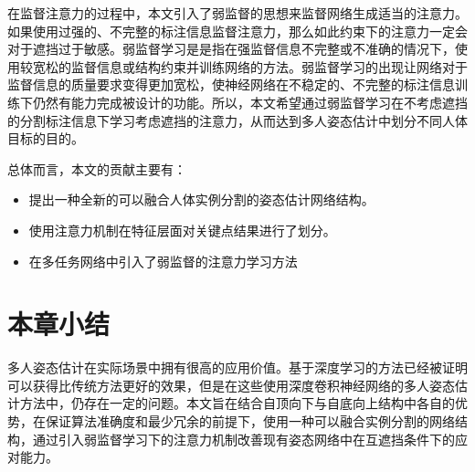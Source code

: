 在监督注意力的过程中，本文引入了弱监督的思想来监督网络生成适当的注意力。如果使用过强的、不完整的标注信息监督注意力，那么如此约束下的注意力一定会对于遮挡过于敏感。弱监督学习是是指在强监督信息不完整或不准确的情况下，使用较宽松的监督信息或结构约束并训练网络的方法\cite{10.1093/nsr/nwx106}。弱监督学习的出现让网络对于监督信息的质量要求变得更加宽松，使神经网络在不稳定的、不完整的标注信息训练下仍然有能力完成被设计的功能。所以，本文希望通过弱监督学习在不考虑遮挡的分割标注信息下学习考虑遮挡的注意力，从而达到多人姿态估计中划分不同人体目标的目的。

总体而言，本文的贡献主要有：
\begin{itemize}
	\item 提出一种全新的可以融合人体实例分割的姿态估计网络结构。
	\item 使用注意力机制在特征层面对关键点结果进行了划分。
	\item 在多任务网络中引入了弱监督的注意力学习方法
\end{itemize}

\section{本章小结}
\label{sec:introconclusion}
多人姿态估计在实际场景中拥有很高的应用价值。基于深度学习的方法已经被证明可以获得比传统方法更好的效果，但是在这些使用深度卷积神经网络的多人姿态估计方法中，仍存在一定的问题。本文旨在结合自顶向下与自底向上结构中各自的优势，在保证算法准确度和最少冗余的前提下，使用一种可以融合实例分割的网络结构，通过引入弱监督学习下的注意力机制改善现有姿态网络中在互遮挡条件下的应对能力。